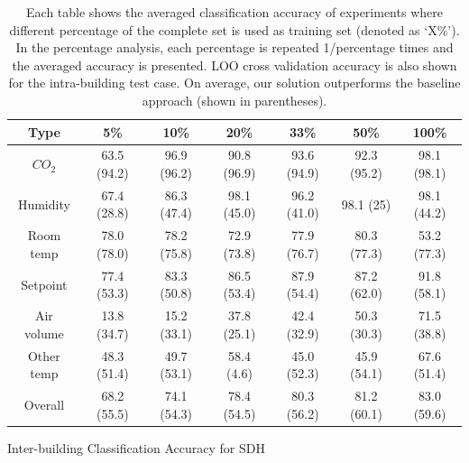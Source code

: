 \begin{table}[ht!]
\centering %
\begin{tabular}{c | c | c | c | c | c | c} \hline
Type & 5\% & 10\% & 20\% & 33\% & 50\% & 100\%\\ %
\hline\hline %
$CO_{2}$ & 63.5 (94.2) & 96.9 (96.2) & 90.8 (96.9) & 93.6 (94.9) & 92.3 (95.2) & 98.1 (98.1)\\ \hline
Humidity & 67.4 (28.8) & 86.3 (47.4) & 98.1 (45.0) & 96.2 (41.0) & 98.1 (25) & 98.1 (44.2)\\ \hline
Room temp & 78.0 (78.0) & 78.2 (75.8) & 72.9 (73.8) & 77.9 (76.7) & 80.3 (77.3) & 53.2 (77.3)\\ \hline
Setpoint & 77.4 (53.3) & 83.3 (50.8) & 86.5 (53.4) & 87.9 (54.4) & 87.2 (62.0) & 91.8 (58.1)\\ \hline
Air volume & 13.8 (34.7) & 15.2 (33.1) & 37.8 (25.1) & 42.4 (32.9) & 50.3 (30.3) & 71.5 (38.8)\\ \hline
Other temp & 48.3 (51.4) & 49.7 (53.1) & 58.4 (4.6) & 45.0 (52.3) & 45.9 (54.1) & 67.6 (51.4)\\ \hline
Overall & 68.2 (55.5) & 74.1 (54.3) & 78.4 (54.5) & 80.3 (56.2) & 81.2 (60.1) & 83.0 (59.6)\\ \hline
\end{tabular}
\caption{Inter-building Classification Accuracy for SDH}
\caption*{Each table shows the averaged classification accuracy of experiments where different percentage of the complete set is used as training set (denoted as `X\%'). In the percentage analysis, each percentage is repeated 1/percentage times and the averaged accuracy is presented. LOO cross validation accuracy is also shown for the intra-building test case. On average, our solution outperforms the baseline approach (shown in parentheses).}
\label{table:sdh_x} %
\end{table}


